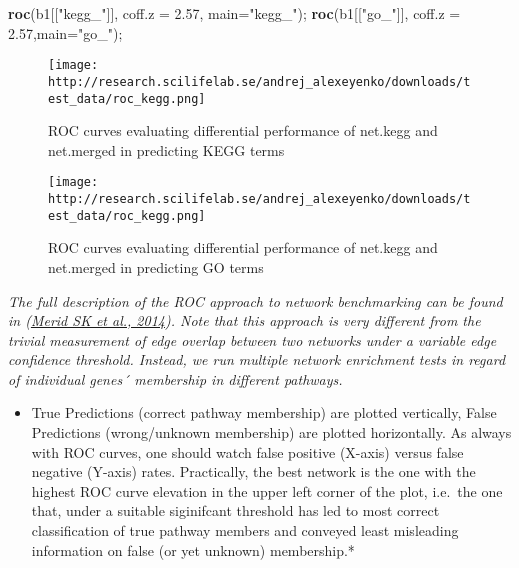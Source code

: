 \documentclass[]{article}
\newenvironment{Shaded}{\begin{snugshade}}{\end{snugshade}}
\newcommand{\KeywordTok}[1]{\textcolor[rgb]{0.13,0.29,0.53}{\textbf{#1}}}
\newcommand{\DataTypeTok}[1]{\textcolor[rgb]{0.13,0.29,0.53}{#1}}
\newcommand{\FloatTok}[1]{\textcolor[rgb]{0.00,0.00,0.81}{#1}}
\newcommand{\StringTok}[1]{\textcolor[rgb]{0.31,0.60,0.02}{#1}}
\newcommand{\NormalTok}[1]{#1}
\providecommand{\tightlist}{%
  \setlength{\itemsep}{0pt}\setlength{\parskip}{0pt}}
\begin{document}
\begin{Shaded}
\begin{Highlighting}[]
\KeywordTok{roc}\NormalTok{(b1[[}\StringTok{"kegg_"}\NormalTok{]], }\DataTypeTok{coff.z =} \FloatTok{2.57}\NormalTok{, }\DataTypeTok{main=}\StringTok{"kegg_"}\NormalTok{); }
\KeywordTok{roc}\NormalTok{(b1[[}\StringTok{"go_"}\NormalTok{]], }\DataTypeTok{coff.z =} \FloatTok{2.57}\NormalTok{,}\DataTypeTok{main=}\StringTok{"go_"}\NormalTok{);}
\end{Highlighting}
\end{Shaded}

\begin{figure}
\centering
\texttt{[image: http://research.scilifelab.se/andrej\_alexeyenko/downloads/test\_data/roc\_kegg.png]}
\caption{ROC curves evaluating differential performance of net.kegg and
net.merged in predicting KEGG terms \label{figlabn1}}
\end{figure}

\begin{figure}
\centering
\texttt{[image: http://research.scilifelab.se/andrej\_alexeyenko/downloads/test\_data/roc\_kegg.png]}
\caption{ROC curves evaluating differential performance of net.kegg and
net.merged in predicting GO terms}
\end{figure}

\emph{The full description of the ROC approach to network benchmarking
can be found in
(\href{http://bmcbioinformatics.biomedcentral.com/articles/10.1186/1471-2105-15-308}{Merid
SK et al., 2014}). Note that this approach is very different from the
trivial measurement of edge overlap between two networks under a
variable edge confidence threshold. Instead, we run multiple network
enrichment tests in regard of individual genes´ membership in different
pathways.}

\begin{itemize}
\tightlist
\item
  True Predictions (correct pathway membership) are plotted vertically,
  False Predictions (wrong/unknown membership) are plotted horizontally.
  As always with ROC curves, one should watch false positive (X-axis)
  versus false negative (Y-axis) rates. Practically, the best network is
  the one with the highest ROC curve elevation in the upper left corner
  of the plot, i.e.~the one that, under a suitable siginifcant threshold
  has led to most correct classification of true pathway members and
  conveyed least misleading information on false (or yet unknown)
  membership.*
\end{itemize}
\end{document}
